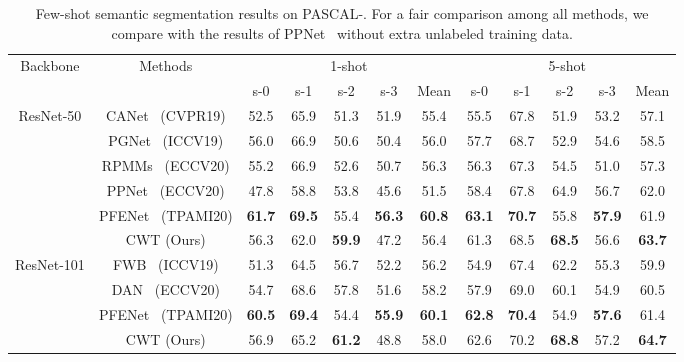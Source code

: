 \documentclass[10pt,twocolumn,letterpaper]{article}
\begin{document}
\begin{table*}[]
    \centering
    \begin{tabular}{c|c|ccccc|ccccc}
    \hline
    \hline
         \multirow{2}{*}{Backbone} & \multirow{2}{*}{Methods} & \multicolumn{5}{c}{1-shot} & \multicolumn{5}{c}{5-shot} \\
         \cline{3-12}
          & & s-0 & s-1 & s-2 & s-3 & Mean & s-0 & s-1 & s-2 & s-3 & Mean \\
\hline
         \multirow{6}{*}{ResNet-50} & CANet~\cite{zhang2019canet} (CVPR19) & 52.5 & 65.9 & 51.3 & 51.9 & 55.4 & 55.5 & 67.8 & 51.9 & 53.2 & 57.1 \\
         & PGNet~\cite{zhang2019pyramid} (ICCV19) & 56.0 & 66.9 & 50.6 & 50.4 & 56.0 & 57.7 & 68.7 & 52.9 & 54.6 & 58.5 \\
         & RPMMs~\cite{yang2020prototype} (ECCV20) & 55.2 & 66.9 & 52.6 & 50.7 & 56.3 & 56.3 & 67.3 & 54.5 & 51.0 & 57.3 \\
         & PPNet~\cite{liu2020part} (ECCV20) & 47.8 & 58.8 & 53.8 & 45.6 & 51.5 & 58.4 & 67.8 & 64.9 & 56.7 & 62.0 \\
         & PFENet~\cite{tian2020prior} (TPAMI20) & \textbf{61.7} & \textbf{69.5} & 55.4 & \textbf{56.3} & \textbf{60.8} & \textbf{63.1} & \textbf{70.7} & 55.8 & \textbf{57.9} & 61.9 \\
         & CWT (Ours) & 56.3 & 62.0 & \textbf{59.9} & 47.2 & 56.4 & 61.3 & 68.5 & \textbf{68.5} & 56.6 & \textbf{63.7} \\
         \hline
         \multirow{4}{*}{ResNet-101} & FWB~\cite{nguyen2019feature} (ICCV19) & 51.3 & 64.5 & 56.7 & 52.2 & 56.2 & 54.9 & 67.4 & 62.2 & 55.3 & 59.9 \\
         & DAN~\cite{cao2020few} (ECCV20) & 54.7 & 68.6 & 57.8 & 51.6 & 58.2 & 57.9 & 69.0 & 60.1 & 54.9 & 60.5 \\
         & PFENet~\cite{tian2020prior} (TPAMI20) & \textbf{60.5} & \textbf{69.4} & 54.4 & \textbf{55.9} & \textbf{60.1} & \textbf{62.8} & \textbf{70.4} & 54.9 & \textbf{57.6} & 61.4 \\
         & CWT (Ours) & 56.9 & 65.2 & \textbf{61.2} & 48.8 & 58.0 & 62.6 & 70.2 & \textbf{68.8} & 57.2 & \textbf{64.7} \\
         \hline
         \hline
    \end{tabular}
    \vspace{2pt}
    \caption{Few-shot semantic segmentation results on PASCAL-. 
    For a fair comparison among all methods,
    we compare with the results of PPNet~\cite{liu2020part}
    without extra unlabeled training data.
    }
    \label{tab:main_pascal}
\end{table*}
\end{document}

